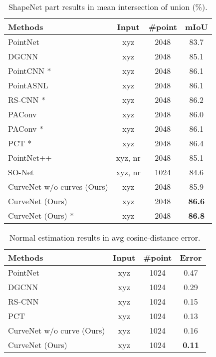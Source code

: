 \documentclass[10pt,twocolumn,letterpaper]{article}
\theoremstyle{definition}
\begin{document}
\begin{table} 
	\begin{center}
	\caption{ShapeNet part results in mean intersection of union (\%).}
		\begin{tabular}{l|ccc} 
			\toprule 
			Methods & Input & \#point & mIoU\\
			\hline
			\hline
			PointNet \cite{qi2017pointnet} & xyz & 2048 & 83.7\\
			DGCNN \cite{wang2019dynamic} & xyz & 2048  & 85.1 \\
PointCNN \cite{li2018pointcnn} * & xyz & 2048 & 86.1 \\ 
			PointASNL \cite{yan2020pointasnl} & xyz & 2048 & 86.1\\
			RS-CNN \cite{liu2019relation} *& xyz & 2048 & 86.2 \\
PAConv \cite{xu2021paconv} & xyz & 2048 & 86.0 \\
			PAConv \cite{xu2021paconv} * & xyz & 2048 & 86.1 \\
			PCT \cite{guo2020pct} * & xyz & 2048 & 86.4 \\
			
\hline
			PointNet++ \cite{qi2017pointnet++} & xyz, nr & 2048 & 85.1 \\
			SO-Net \cite{li2018so} & xyz, nr & 1024 & 84.6\\
			\hline
			CurveNet w/o curves (Ours) & xyz & 2048 & 85.9\\
			CurveNet (Ours)  & xyz & 2048 & \textbf{86.6}\\
			CurveNet (Ours) *& xyz & 2048  & \textbf{86.8}\\
			\bottomrule
		\end{tabular}
		
		\label{table:shapenet}

	\end{center}
\end{table} 

\begin{table} 
	\begin{center}
	\caption{Normal estimation results in avg cosine-distance error.}
		\begin{tabular}{l|ccc} 
			\toprule 
			Methods & Input & \#point & Error\\
			\hline
			\hline
			PointNet \cite{qi2017pointnet} & xyz & 1024 & 0.47\\
			DGCNN \cite{wang2019dynamic} & xyz & 1024  & 0.29 \\
			
			RS-CNN \cite{liu2019relation} & xyz & 1024 & 0.15 \\
			PCT \cite{guo2020pct}  & xyz & 1024  & 0.13 \\
			\hline
			CurveNet w/o curve (Ours) & xyz & 1024 & 0.16\\
			CurveNet (Ours) & xyz & 1024 &  \textbf{0.11}\\
			\bottomrule
		\end{tabular}
		
		\label{table:normal}

	\end{center}
\end{table} 
\end{document}
